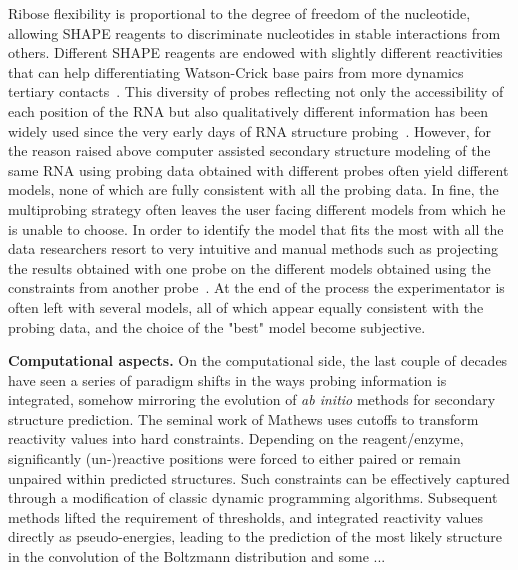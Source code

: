 \documentclass[a4,center,fleqn]{NAR}
\begin{document}
\enlargethispage{-65.1pt}


Ribose flexibility is proportional to the degree of freedom of the nucleotide, allowing SHAPE reagents to discriminate nucleotides in stable interactions from others. Different SHAPE reagents are endowed with slightly different reactivities that can help differentiating Watson-Crick base pairs from more dynamics tertiary contacts~\cite{Gherghe2008,Steen2012}. This diversity of probes reflecting not only the accessibility of each position of the RNA but also qualitatively different information has been widely used since the very early days of RNA structure probing~\cite{Moazed1986, Romaniuk1988, Butcher1994, Brunel2000,  Cordero2015, Somarowthu2015, Gross2017}. However, for the reason raised above computer assisted secondary structure modeling of the same RNA using probing data obtained with different probes often yield different models, none of which are fully consistent with all the probing data. In fine, the multiprobing strategy often leaves the user facing different models from which he is unable to choose. 
In order to identify the model that fits the most with all the data researchers resort to very intuitive and manual methods such as projecting the results obtained with one probe on the different models obtained using the constraints from another probe~\cite{Herbreteau2005,James2008,Weill2004,Othman2014}. At the end of the process the experimentator is often left with several models, all of which appear equally consistent with the probing data, and the choice of the "best" model become subjective. 


{\noindent\bf Computational aspects.}
On the computational side, the last couple of decades have seen a series of paradigm shifts in the ways probing information is integrated, somehow mirroring the evolution of {\em ab initio} methods for secondary structure prediction. The seminal work of Mathews uses cutoffs to transform reactivity values into hard constraints. Depending on the reagent/enzyme, significantly (un-)reactive positions were forced to either paired or remain unpaired within predicted structures. Such constraints can be effectively captured through a modification of classic dynamic programming algorithms. Subsequent methods lifted the requirement of thresholds, and integrated reactivity values directly as pseudo-energies, leading to the prediction of the most likely structure in the convolution of the Boltzmann distribution and some ...
\end{document}

